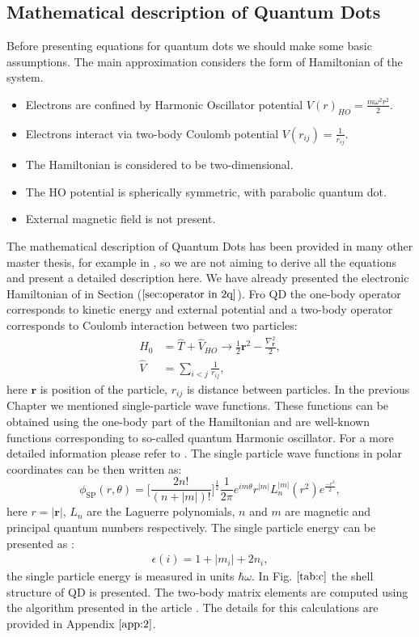 \subsection{Mathematical description of Quantum Dots}\label{sec:math_qd}
Before presenting equations for quantum dots we should make some basic assumptions. The main approximation considers the form of Hamiltonian of the system.\\
\begin{itemize}
	\item Electrons are confined by Harmonic Oscillator potential $V(r)_{HO}=\frac{m\omega^2 r^2}{2}$.
	\item Electrons interact via two-body Coulomb potential  $V(r_{ij})=\frac{1}{r_{ij}}$.
	\item The Hamiltonian is considered to be two-dimensional.
	\item The HO potential is spherically symmetric, with  parabolic quantum dot.
	\item External magnetic field is not present.
\end{itemize}

The mathematical description of Quantum Dots has been provided in many other master thesis, for example in \cite{lohneCOUPLEDCLUSTERSTUDIESQUANTUM}, so we are not aiming to derive all the equations and present a detailed description here. We have already presented the electronic Hamiltonian of in Section ($\ref{sec:operator in 2q}$). Fro QD the one-body operator corresponds to kinetic energy and external potential and a two-body operator corresponds to Coulomb interaction between two particles:
\begin{align}
\hat{H}_0&= \hat{T}+\hat{V}_{HO} \rightarrow \frac{1}{2} \textbf{r}^2-\frac{\nabla_\textbf{r}^2}{2} ,\\
\hat{V}&= \sum_{i<j}\frac{1}{r_{ij}},
\end{align}
here $\textbf{r}$ is position of the particle, $r_{ij}$ is distance between particles.
In the previous Chapter we mentioned single-particle wave functions. These functions can be obtained using the one-body part of the Hamiltonian and are well-known functions corresponding to so-called quantum Harmonic oscillator. For a more detailed information please refer to \cite{sakuraiModernQuantumMechanics1993}. The single particle wave functions in polar coordinates can be then written as:
\begin{equation}
\phi_\text{SP}(r,\theta)= \bigg[ \frac{2n!}{(n+|m|)!} \bigg]^{\frac{1}{2}} \frac{1}{2\pi} e^{im\theta}r^{|m|}L_n^{|m|}(r^2)e^{\frac{-r^2}{2}},
\end{equation}
here $r=|\textbf{r}|$, $L_n$ are the Laguerre polynomials, $n$ and $m$ are magnetic and principal quantum numbers respectively.
The single particle energy can be presented as :
\begin{eqnarray}
\epsilon(i)= 1+|m_i|+ 2n_i,
\end{eqnarray}
the single particle energy is measured in units $\hbar\omega$. In Fig. $\ref{tab:c}$ the shell structure of QD is presented.
The two-body matrix elements are computed using the algorithm presented in the article \cite{EnergySpectraFewelectron}. The details for this calculations are provided in Appendix $\ref{app:2}$.

